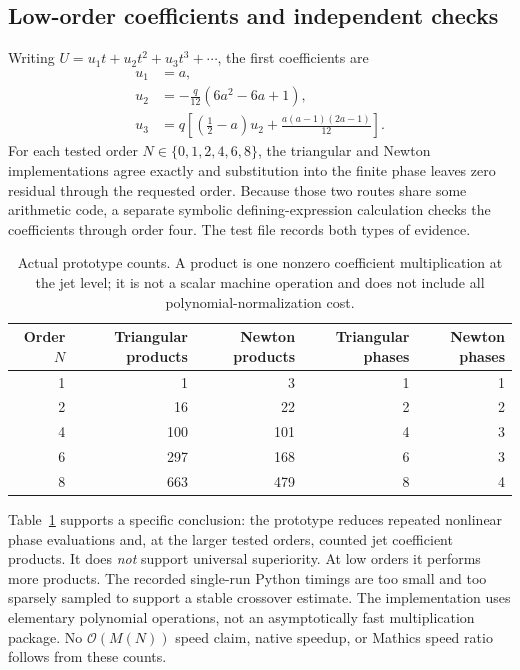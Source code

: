 \documentclass[11pt,letterpaper]{article}
\newcommand{\OO}{\mathcal{O}}
\begin{document}
\subsection{Low-order coefficients and independent checks}
Writing $U=u_1t+u_2t^2+u_3t^3+\cdots$, the first coefficients are
\begin{align*}
 u_1&=a,\\
 u_2&=-\frac{q}{12}(6a^2-6a+1),\\
 u_3&=q\left[\left(\frac12-a\right)u_2
       +\frac{a(a-1)(2a-1)}{12}\right].
\end{align*}
For each tested order $N\in\{0,1,2,4,6,8\}$, the triangular and Newton implementations agree exactly and substitution into the finite phase leaves zero residual through the requested order. Because those two routes share some arithmetic code, a separate symbolic defining-expression calculation checks the coefficients through order four. The test file records both types of evidence.

\begin{table}[htbp]\centering\small
\begin{tabular}{@{}rrrrr@{}}\toprule
Order $N$ & Triangular products & Newton products & Triangular phases & Newton phases\\\midrule
1&1&3&1&1\\
2&16&22&2&2\\
4&100&101&4&3\\
6&297&168&6&3\\
8&663&479&8&4\\\bottomrule
\end{tabular}
\caption{Actual prototype counts. A product is one nonzero coefficient multiplication at the jet level; it is not a scalar machine operation and does not include all polynomial-normalization cost.}
\label{tab:gamma-counts}
\end{table}

Table~\ref{tab:gamma-counts} supports a specific conclusion: the prototype reduces repeated nonlinear phase evaluations and, at the larger tested orders, counted jet coefficient products. It does \emph{not} support universal superiority. At low orders it performs more products. The recorded single-run Python timings are too small and too sparsely sampled to support a stable crossover estimate. The implementation uses elementary polynomial operations, not an asymptotically fast multiplication package. No $\OO(M(N))$ speed claim, native speedup, or Mathics speed ratio follows from these counts.
\end{document}
